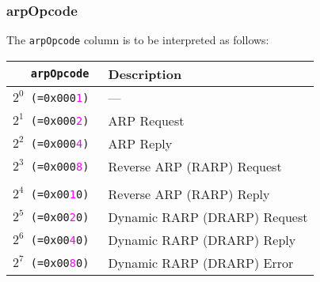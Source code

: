 \documentclass[documentation]{subfiles}
\begin{document}
\subsubsection{arpOpcode}\label{arpOpcode}
The {\tt arpOpcode} column is to be interpreted as follows:\\
\begin{minipage}{.48\textwidth}
    \begin{longtable}{>{\tt}rl}
        \toprule
        {\bf arpOpcode} & {\bf Description}\\
        \midrule\endhead%
        $2^{0}$  (=0x000\textcolor{magenta}{1}) & ---\\
        $2^{1}$  (=0x000\textcolor{magenta}{2}) & ARP Request\\
        $2^{2}$  (=0x000\textcolor{magenta}{4}) & ARP Reply\\
        $2^{3}$  (=0x000\textcolor{magenta}{8}) & Reverse ARP (RARP) Request\\
        \\
        $2^{4}$  (=0x00\textcolor{magenta}{1}0) & Reverse ARP (RARP) Reply\\
        $2^{5}$  (=0x00\textcolor{magenta}{2}0) & Dynamic RARP (DRARP) Request\\
        $2^{6}$  (=0x00\textcolor{magenta}{4}0) & Dynamic RARP (DRARP) Reply\\
        $2^{7}$  (=0x00\textcolor{magenta}{8}0) & Dynamic RARP (DRARP) Error\\
        \bottomrule
    \end{longtable}
\end{minipage}
\hfill
\end{document}
